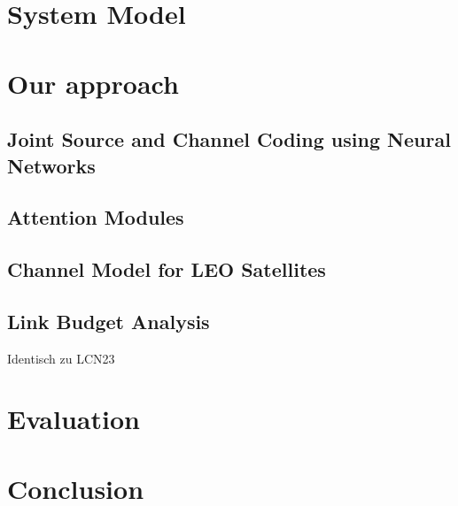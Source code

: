 \documentclass[conference]{IEEEtran}
\begin{document}
\section{System Model}
\label{sec:system_model}

\section{Our approach}
\subsection{Joint Source and Channel Coding using Neural Networks}
\subsection{Attention Modules}
\subsection{Channel Model for LEO Satellites}
\subsection{Link Budget Analysis}
Identisch zu LCN23

\section{Evaluation}
\section{Conclusion}

\nocite{Wei2004} %



\end{document}
